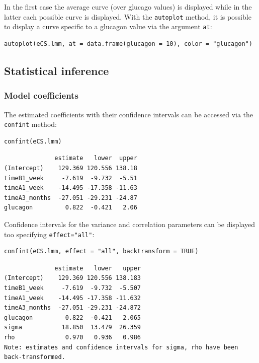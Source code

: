 \documentclass[12pt]{article}
\begin{document}
In the first case the average curve (over glucago values) is displayed
while in the latter each possible curve is displayed. With the
\texttt{autoplot} method, it is possible to display a curve specific to a
glucagon value via the argument \texttt{at}:
\lstset{language=r,label= ,caption= ,captionpos=b,numbers=none}
\begin{lstlisting}
autoplot(eCS.lmm, at = data.frame(glucagon = 10), color = "glucagon")
\end{lstlisting}

\subsection{Statistical inference}
\label{sec:orge82237d}

\subsubsection{Model coefficients}
\label{sec:org7d09cf5}

The estimated coefficients with their confidence intervals can be accessed via the \texttt{confint} method:
\lstset{language=r,label= ,caption= ,captionpos=b,numbers=none}
\begin{lstlisting}
confint(eCS.lmm)
\end{lstlisting}

\begin{verbatim}
              estimate   lower  upper
(Intercept)    129.369 120.556 138.18
timeB1_week     -7.619  -9.732  -5.51
timeA1_week    -14.495 -17.358 -11.63
timeA3_months  -27.051 -29.231 -24.87
glucagon         0.822  -0.421   2.06
\end{verbatim}


\clearpage

Confidence intervals for the variance and correlation parameters can
be displayed too specifying \texttt{effect="all"}:
\lstset{language=r,label= ,caption= ,captionpos=b,numbers=none}
\begin{lstlisting}
confint(eCS.lmm, effect = "all", backtransform = TRUE)
\end{lstlisting}

\begin{verbatim}
              estimate   lower   upper
(Intercept)    129.369 120.556 138.183
timeB1_week     -7.619  -9.732  -5.507
timeA1_week    -14.495 -17.358 -11.632
timeA3_months  -27.051 -29.231 -24.872
glucagon         0.822  -0.421   2.065
sigma           18.850  13.479  26.359
rho              0.970   0.936   0.986
Note: estimates and confidence intervals for sigma, rho have been back-transformed.
\end{verbatim}
\end{document}
